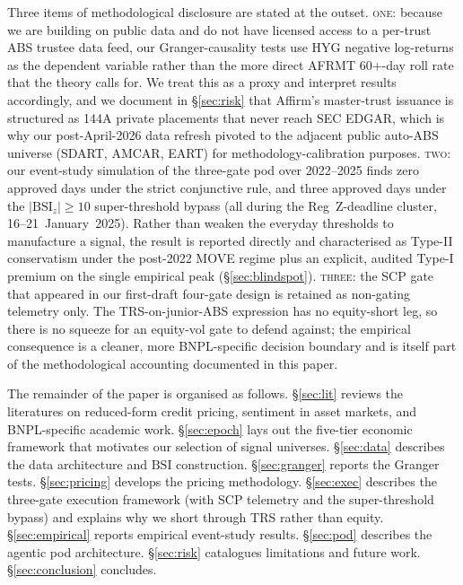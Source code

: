 \documentclass[11pt,letterpaper]{article}
\newcommand{\bsi}{\text{BSI}}
\begin{document}
Three items of methodological disclosure are stated at the outset.
\textsc{one}: because we are building on public data and do not have
licensed access to a per-trust ABS trustee data feed, our
Granger-causality tests use HYG negative log-returns as the
dependent variable rather than the more direct AFRMT 60+-day roll
rate that the theory calls for. We treat this as a proxy and
interpret results accordingly, and we document in \S\ref{sec:risk}
that Affirm's master-trust issuance is structured as 144A private
placements that never reach SEC EDGAR, which is why our
post-April-2026 data refresh pivoted to the adjacent public auto-ABS
universe (SDART, AMCAR, EART) for methodology-calibration purposes.
\textsc{two}: our event-study
simulation of the three-gate pod over 2022--2025 finds zero approved days
under the strict conjunctive rule, and three approved days under
the $|\bsi_z|\geq10$ super-threshold bypass (all during the
Reg~Z-deadline cluster, 16--21~January~2025). Rather than weaken the
everyday thresholds to manufacture a signal, the result is reported
directly and characterised as Type-II conservatism under the post-2022
MOVE regime plus an explicit, audited Type-I premium on the single
empirical peak (\S\ref{sec:blindspot}). \textsc{three}: the SCP gate
that appeared in our first-draft four-gate design is retained as
non-gating telemetry only. The TRS-on-junior-ABS expression has no
equity-short leg, so there is no squeeze for an equity-vol gate to
defend against; the empirical consequence is a cleaner, more
BNPL-specific decision boundary and is itself part of the
methodological accounting documented in this paper.

The remainder of the paper is organised as follows.
\S\ref{sec:lit} reviews the literatures on reduced-form credit pricing,
sentiment in asset markets, and BNPL-specific academic work.
\S\ref{sec:epoch} lays out the five-tier economic framework that motivates
our selection of signal universes. \S\ref{sec:data} describes the data
architecture and $\bsi$ construction. \S\ref{sec:granger} reports the
Granger tests. \S\ref{sec:pricing} develops the pricing methodology.
\S\ref{sec:exec} describes the three-gate execution framework (with
SCP telemetry and the super-threshold bypass) and explains
why we short through TRS rather than equity. \S\ref{sec:empirical} reports
empirical event-study results. \S\ref{sec:pod} describes the agentic pod
architecture. \S\ref{sec:risk} catalogues limitations and future work.
\S\ref{sec:conclusion} concludes.


\end{document}
